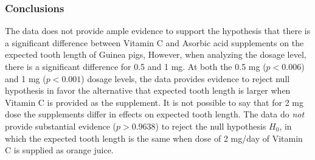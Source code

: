 \documentclass[
]{article}
\begin{document}
\hypertarget{conclusions}{%
\subsubsection{Conclusions}\label{conclusions}}

The data does not provide ample evidence to support the hypothesis that
there is a significant difference between Vitamin C and Asorbic acid
supplements on the expected tooth length of Guinea pigs, However, when
analyzing the dosage level, there is a significant difference for 0.5
and 1 mg. At both the 0.5 mg (\(p < 0.006\)) and 1 mg (\(p < 0.001\))
dosage levels, the data provides evidence to reject null hypothesis in
favor the alternative that expected tooth length is larger when Vitamin
C is provided as the supplement. It is not possible to say that for 2 mg
dose the supplements differ in effects on expected tooth length. The
data do \emph{not} provide substantial evidence (\(p > 0.9638\)) to
reject the null hypothesis \(H_0\), in which the expected tooth length
is the same when dose of 2 mg/day of Vitamin C is supplied as orange
juice.
\end{document}
